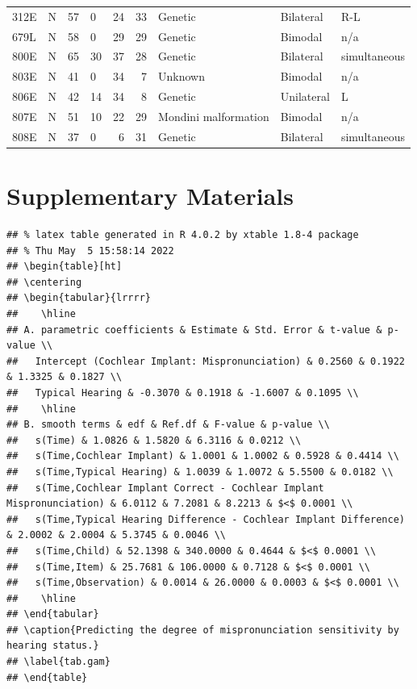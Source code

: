 \documentclass[
]{article}
\begin{document}
\begin{table}[!h]
\begin{tabular}[t]{llrlrrlll}
312E & N & 57 & 0 & 24 & 33 & Genetic & Bilateral & R-L\\
679L & N & 58 & 0 & 29 & 29 & Genetic & Bimodal & n/a\\
\addlinespace
800E & N & 65 & 30 & 37 & 28 & Genetic & Bilateral & simultaneous\\
803E & N & 41 & 0 & 34 & 7 & Unknown & Bimodal & n/a\\
806E & N & 42 & 14 & 34 & 8 & Genetic & Unilateral & L\\
807E & N & 51 & 10 & 22 & 29 & Mondini malformation & Bimodal & n/a\\
808E & N & 37 & 0 & 6 & 31 & Genetic & Bilateral & simultaneous\\
\bottomrule
\end{tabular}
\end{table}

\hypertarget{supplementary-materials}{%
\section{Supplementary Materials}\label{supplementary-materials}}

\begin{verbatim}
## % latex table generated in R 4.0.2 by xtable 1.8-4 package
## % Thu May  5 15:58:14 2022
## \begin{table}[ht]
## \centering
## \begin{tabular}{lrrrr}
##    \hline
## A. parametric coefficients & Estimate & Std. Error & t-value & p-value \\ 
##   Intercept (Cochlear Implant: Mispronunciation) & 0.2560 & 0.1922 & 1.3325 & 0.1827 \\ 
##   Typical Hearing & -0.3070 & 0.1918 & -1.6007 & 0.1095 \\ 
##    \hline
## B. smooth terms & edf & Ref.df & F-value & p-value \\ 
##   s(Time) & 1.0826 & 1.5820 & 6.3116 & 0.0212 \\ 
##   s(Time,Cochlear Implant) & 1.0001 & 1.0002 & 0.5928 & 0.4414 \\ 
##   s(Time,Typical Hearing) & 1.0039 & 1.0072 & 5.5500 & 0.0182 \\ 
##   s(Time,Cochlear Implant Correct - Cochlear Implant Mispronunciation) & 6.0112 & 7.2081 & 8.2213 & $<$ 0.0001 \\ 
##   s(Time,Typical Hearing Difference - Cochlear Implant Difference) & 2.0002 & 2.0004 & 5.3745 & 0.0046 \\ 
##   s(Time,Child) & 52.1398 & 340.0000 & 0.4644 & $<$ 0.0001 \\ 
##   s(Time,Item) & 25.7681 & 106.0000 & 0.7128 & $<$ 0.0001 \\ 
##   s(Time,Observation) & 0.0014 & 26.0000 & 0.0003 & $<$ 0.0001 \\ 
##    \hline
## \end{tabular}
## \caption{Predicting the degree of mispronunciation sensitivity by hearing status.} 
## \label{tab.gam}
## \end{table}
\end{verbatim}
\end{document}
